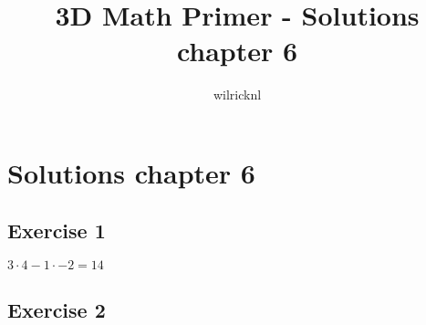 \documentclass[11pt]{article}
\author{wilricknl}
\title{3D Math Primer - Solutions chapter 6}
\begin{document}
\maketitle

\section{Solutions chapter 6}

\subsection{Exercise 1}

$3 \cdot 4 - 1 \cdot -2 = 14$

\subsection{Exercise 2}
\end{document}
